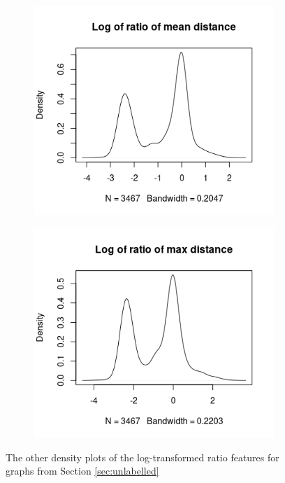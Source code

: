\documentclass{l4proj}
\theoremstyle{definition}
\theoremstyle{remark}
\begin{document}
\begin{figure}
\begin{subfigure}[t]{0.49\textwidth}
    \centering
    \includegraphics[width=\textwidth]{images/sip_ratio_meandist.png}
  \end{subfigure}
  \begin{subfigure}[t]{0.49\textwidth}
    \centering
    \includegraphics[width=\textwidth]{images/sip_ratio_maxdist.png}
  \end{subfigure}
  \caption{The other density plots of the log-transformed ratio features for
    graphs from Section \ref{sec:unlabelled}}
  \label{fig:sip_ratio}
\end{figure}
\end{document}
